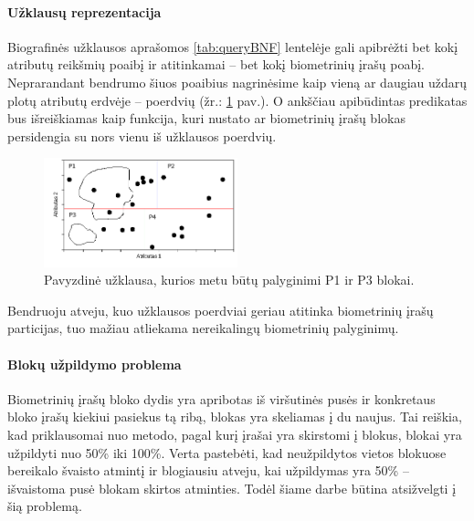 \paragraph{Užklausų reprezentacija}

Biografinės užklausos aprašomos \ref{tab:queryBNF} lentelėje gali apibrėžti bet kokį atributų reikšmių poaibį ir atitinkamai -- bet kokį biometrinių įrašų poabį.
Neprarandant bendrumo šiuos poaibius nagrinėsime kaip vieną ar daugiau uždarų plotų atributų erdvėje -- poerdvių (žr.: \ref{img:multidimensionalPartitionedGalleryWithQuery} pav.). %
O ankščiau apibūdintas predikatas bus išreiškiamas kaip funkcija, kuri nustato ar biometrinių įrašų blokas persidengia su nors vienu iš užklausos poerdvių.

\begin{figure}[H]
\begin{center}
\includegraphics[width=0.5\textwidth]{img/MultidimensionalPartitionedGalleryWithQuery.png}
\caption{Pavyzdinė užklausa, kurios metu būtų palyginimi P1 ir P3 blokai.}
\label{img:multidimensionalPartitionedGalleryWithQuery}
\end{center}
\end{figure}

Bendruoju atveju, kuo užklausos poerdviai geriau atitinka biometrinių įrašų particijas, tuo mažiau atliekama nereikalingų biometrinių palyginimų.

\paragraph{Blokų užpildymo problema}

Biometrinių įrašų bloko dydis yra apribotas iš viršutinės pusės ir konkretaus bloko įrašų kiekiui pasiekus tą ribą, blokas yra skeliamas į du naujus.
Tai reiškia, kad priklausomai nuo metodo, pagal kurį įrašai yra skirstomi į blokus, blokai yra užpildyti nuo 50\% iki 100\%.
Verta pastebėti, kad neužpildytos vietos blokuose bereikalo švaisto atmintį ir blogiausiu atveju, kai užpildymas yra 50\% -- išvaistoma pusė blokam skirtos atminties.
Todėl šiame darbe būtina atsižvelgti į šią problemą.

